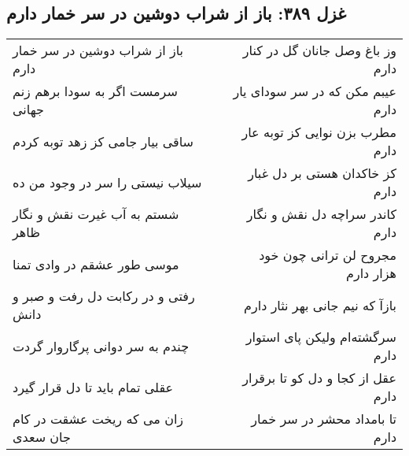 \begin{center}
\section*{غزل ۳۸۹: باز از شراب دوشین در سر خمار دارم}
\label{sec:389}
\begin{longtable}{l p{0.5cm} r}
باز از شراب دوشین در سر خمار دارم
&&
وز باغ وصل جانان گل در کنار دارم
\\
سرمست اگر به سودا برهم زنم جهانی
&&
عیبم مکن که در سر سودای یار دارم
\\
ساقی بیار جامی کز زهد توبه کردم
&&
مطرب بزن نوایی کز توبه عار دارم
\\
سیلاب نیستی را سر در وجود من ده
&&
کز خاکدان هستی بر دل غبار دارم
\\
شستم به آب غیرت نقش و نگار ظاهر
&&
کاندر سراچه دل نقش و نگار دارم
\\
موسی طور عشقم در وادی تمنا
&&
مجروح لن ترانی چون خود هزار دارم
\\
رفتی و در رکابت دل رفت و صبر و دانش
&&
بازآ که نیم جانی بهر نثار دارم
\\
چندم به سر دوانی پرگاروار گردت
&&
سرگشته‌ام ولیکن پای استوار دارم
\\
عقلی تمام باید تا دل قرار گیرد
&&
عقل از کجا و دل کو تا برقرار دارم
\\
زان می که ریخت عشقت در کام جان سعدی
&&
تا بامداد محشر در سر خمار دارم
\\
\end{longtable}
\end{center}
